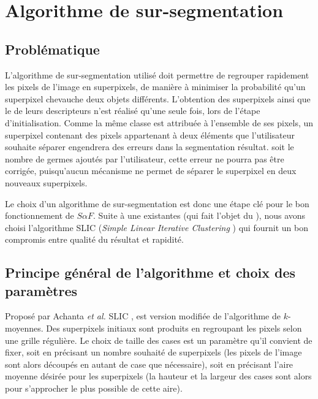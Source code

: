 \section{Algorithme de sur-segmentation}

\subsection{Problématique}
L'algorithme de sur-segmentation utilisé doit permettre de regrouper rapidement les pixels de l'image en superpixels, de manière à minimiser la probabilité qu'un superpixel chevauche deux objets différents. L'obtention des superpixels ainsi que le  de leurs descripteurs n'est réalisé qu'une seule fois, lors de l'étape d'initialisation. Comme la même classe est attribuée à l'ensemble de ses pixels, un superpixel contenant des pixels appartenant à deux éléments que l'utilisateur souhaite séparer engendrera des erreurs dans la segmentation résultat.  soit le nombre de germes ajoutés par l'utilisateur, cette erreur ne pourra pas être corrigée, puisqu'aucun mécanisme ne permet de séparer le superpixel en deux nouveaux superpixels. 

Le choix d'un algorithme de sur-segmentation est donc une étape clé pour le bon fonctionnement de $S \alpha F$. Suite à une  existantes (qui fait l'objet du ), nous avons choisi l'algorithme SLIC (\og \textit{Simple Linear Iterative Clustering} \fg) \cite{achanta2012slic} qui fournit un bon compromis entre qualité du résultat et rapidité.

\subsection{Principe général de l'algorithme  et choix des paramètres} 

Proposé par Achanta \textit{et al.}  SLIC \cite{achanta2012slic}, est  version modifiée de l'algorithme de $k$-moyennes. Des superpixels initiaux sont produits en regroupant les pixels selon une grille régulière. Le choix de taille des cases est un paramètre qu'il convient de fixer, soit en précisant un nombre souhaité de superpixels (les pixels de l'image sont alors découpés en autant de case que nécessaire), soit en précisant l'aire moyenne désirée pour les superpixels (la hauteur et la largeur des cases sont alors  pour s'approcher le plus possible de cette aire). 

